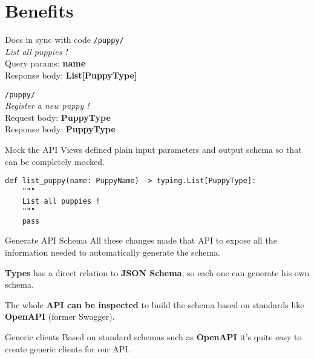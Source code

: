 \section{Benefits}
\begin{frame}{Docs in sync with code}
    \textbf{\color{Teal}{GET}} \texttt{/puppy/}\\
    \textit{List all puppies !}\\
    Query params: \textbf{name}\\
    Response body: \textbf{List[PuppyType]}

    \vspace{3em}

    \textbf{\color{Teal}{POST}} \texttt{/puppy/}\\
    \textit{Register a new puppy !}\\
    Request body: \textbf{PuppyType}\\
    Response body: \textbf{PuppyType}
\end{frame}

\begin{frame}[fragile]{Mock the API}
    Views defined plain input parameters and output schema so that can be completely mocked.

    \begin{verbatim}
def list_puppy(name: PuppyName) -> typing.List[PuppyType]:
    """
    List all puppies !
    """
    pass
    \end{verbatim}
\end{frame}

\begin{frame}{Generate API Schema}
    All these changes made that API to expose all the information needed to automatically generate the schema.
    
    \textbf{Types} has a direct relation to \textbf{JSON Schema}, so each one can generate his own schema.

    The whole \textbf{API can be inspected} to build the schema based on standards like \textbf{OpenAPI} (former Swagger).
\end{frame}

\begin{frame}{Generic clients}
    Based on standard schemas such as \textbf{OpenAPI} it's quite easy to create generic clients for our API.
\end{frame}
